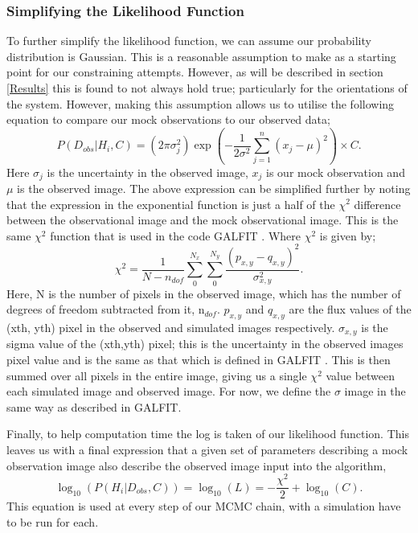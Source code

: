 \subsubsection{Simplifying the Likelihood Function}
To further simplify the likelihood function, we can assume our probability distribution is Gaussian. This is a reasonable assumption to make as a starting point for our constraining attempts. However, as will be described in section \ref{Results} this is found to not always hold true; particularly for the orientations of the system. However, making this assumption allows us to utilise the following equation to compare our mock observations to our observed data;
\begin{equation}\label{like_gauss}
    P(D_{obs}|H_{i},C) = (2\pi\sigma^{2}_{j})\exp(-\frac{1}{2\sigma^{2}}\sum_{j=1}^{n}(x_{j}-\mu)^{2}) \times C.
\end{equation}
Here $\sigma_{j}$ is the uncertainty in the observed image, $x_{j}$ is our mock observation and $\mu$ is the observed image. The above expression can be simplified further by noting that the expression in the exponential function is just a half of the $\chi^{2}$ difference between the observational image and the mock observational image. This is the same $\chi^{2}$ function that is used in the code GALFIT \citep{2002AJ....124..266P}. Where $\chi^{2}$ is given by;
\begin{equation}\label{chi_squared}
    \chi^{2} = \frac{1}{N - n_{dof}}\sum_{0}^{N_{x}}\sum_{0}^{N_{y}}\frac{(p_{x,y} - q_{x,y})^{2}}{\sigma_{x,y}^{2}}.
\end{equation}
Here, N is the number of pixels in the observed image, which has the number of degrees of freedom subtracted from it, n$_{dof}$. $p_{x,y}$ and $q_{x,y}$ are the flux values of the (xth, yth) pixel in the observed and simulated images respectively. $\sigma_{x,y}$ is the sigma value of the (xth,yth) pixel; this is the uncertainty in the observed images pixel value and is the same as that which is defined in GALFIT \citep{2002AJ....124..266P,2010AJ....139.2097P}. This is then summed over all pixels in the entire image, giving us a single $\chi^{2}$ value between each simulated image and observed image. For now, we define the $\sigma$ image in the same way as described in GALFIT.

Finally, to help computation time the log is taken of our likelihood function. This leaves us with a final expression that a given set of parameters describing a mock observation image also describe the observed image input into the algorithm,
\begin{equation}\label{likelihood}
    \log_{10}(P(H_{i}|D_{obs},C)) = \log_{10}(L) = - \frac{\chi^{2}}{2} + \log_{10}(C).
\end{equation}
This equation is used at every step of our MCMC chain, with a simulation have to be run for each.

